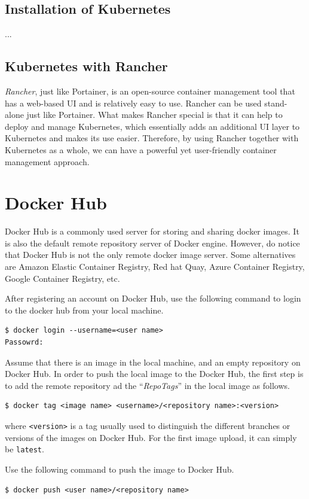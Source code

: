 \subsection{Installation of Kubernetes}

...

\subsection{Kubernetes with Rancher}

\textit{Rancher}, just like Portainer, is an open-source container management tool that has a web-based UI and is relatively easy to use. Rancher can be used stand-alone just like Portainer. What makes Rancher special is that it can help to deploy and manage Kubernetes, which essentially adds an additional UI layer to Kubernetes and makes its use easier. Therefore, by using Rancher together with Kubernetes as a whole, we can have a powerful yet user-friendly container management approach.

\section{Docker Hub}

Docker Hub is a commonly used server for storing and sharing docker images. It is also the default remote repository server of Docker engine. However, do notice that Docker Hub is not the only remote docker image server. Some alternatives are Amazon Elastic Container Registry, Red hat Quay, Azure Container Registry, Google Container Registry, etc.

After registering an account on Docker Hub, use the following command to login to the docker hub from your local machine.
\begin{lstlisting}
$ docker login --username=<user name>
Passowrd:
\end{lstlisting}

Assume that there is an image in the local machine, and an empty repository on Docker Hub. In order to push the local image to the Docker Hub, the first step is to add the remote repository ad the ``\textit{RepoTags}'' in the local image as follows.
\begin{lstlisting}
$ docker tag <image name> <username>/<repository name>:<version>
\end{lstlisting}
where \verb|<version>| is a tag usually used to distinguish the different branches or versions of the images on Docker Hub. For the first image upload, it can simply be \verb|latest|.

Use the following command to push the image to Docker Hub.
\begin{lstlisting}
$ docker push <user name>/<repository name>
\end{lstlisting}




